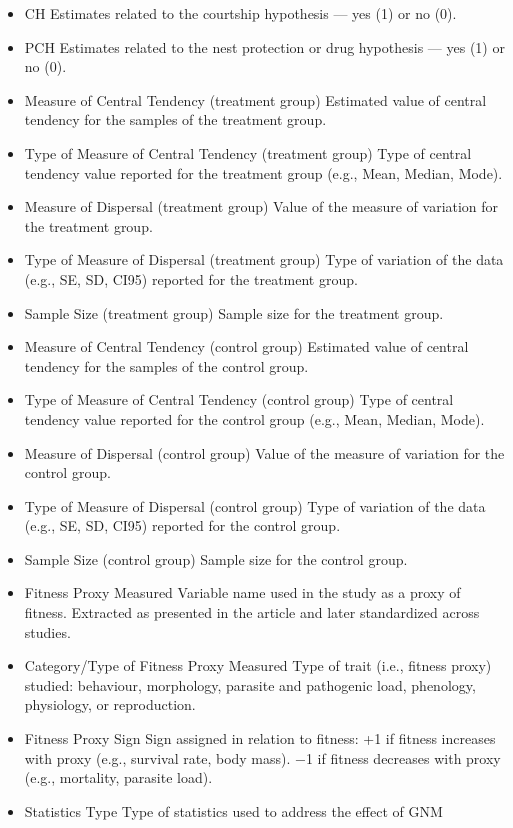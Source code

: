 \documentclass[
  number,
  review,
  onecolumn]{elsarticle}
\begin{document}
\begin{itemize}
\item
  CH Estimates related to the courtship hypothesis --- yes (1) or no
  (0).
\item
  PCH Estimates related to the nest protection or drug hypothesis ---
  yes (1) or no (0).
\item
  Measure of Central Tendency (treatment group) Estimated value of
  central tendency for the samples of the treatment group.
\item
  Type of Measure of Central Tendency (treatment group) Type of central
  tendency value reported for the treatment group (e.g., Mean, Median,
  Mode).
\item
  Measure of Dispersal (treatment group) Value of the measure of
  variation for the treatment group.
\item
  Type of Measure of Dispersal (treatment group) Type of variation of
  the data (e.g., SE, SD, CI95) reported for the treatment group.
\item
  Sample Size (treatment group) Sample size for the treatment group.
\item
  Measure of Central Tendency (control group) Estimated value of central
  tendency for the samples of the control group.
\item
  Type of Measure of Central Tendency (control group) Type of central
  tendency value reported for the control group (e.g., Mean, Median,
  Mode).
\item
  Measure of Dispersal (control group) Value of the measure of variation
  for the control group.
\item
  Type of Measure of Dispersal (control group) Type of variation of the
  data (e.g., SE, SD, CI95) reported for the control group.
\item
  Sample Size (control group) Sample size for the control group.
\item
  Fitness Proxy Measured Variable name used in the study as a proxy of
  fitness. Extracted as presented in the article and later standardized
  across studies.
\item
  Category/Type of Fitness Proxy Measured Type of trait (i.e., fitness
  proxy) studied: behaviour, morphology, parasite and pathogenic load,
  phenology, physiology, or reproduction.
\item
  Fitness Proxy Sign Sign assigned in relation to fitness: +1 if fitness
  increases with proxy (e.g., survival rate, body mass). −1 if fitness
  decreases with proxy (e.g., mortality, parasite load).
\item
  Statistics Type Type of statistics used to address the effect of GNM

\end{itemize}
\end{document}
